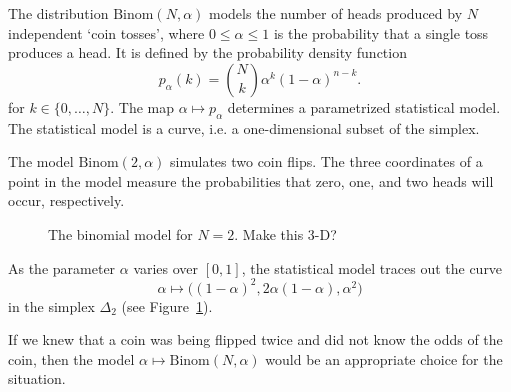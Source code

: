 \documentclass[cclicense]{hmcthesis}
\numberwithin{equation}{chapter}
\numberwithin{thmcounter}{chapter}
\begin{document}
    \begin{example}

        The distribution $\mathrm{Binom}(N, \alpha)$ models the number of heads
        produced by $N$ independent `coin tosses', where \mbox{$0 \le \alpha \le
        1$} is the probability that a single toss produces a head.  It is
        defined by the probability density function
        \[
            p_\alpha(k) = {N \choose k} \alpha^k(1-\alpha)^{n-k}.
        \]
        for $k \in \{0, \ldots, N\}$.  The map $\alpha \mapsto p_\alpha$
        determines a parametrized statistical model.  The statistical model is a
        curve, i.e. a one-dimensional subset of the simplex.  

        The model $\mathrm{Binom}(2, \alpha)$ simulates two coin flips.  The
        three coordinates of a point in the model measure the probabilities that
        zero, one, and two heads will occur, respectively.

        \begin{figure}[H]
            \centering
            \vspace*{-0.2cm}
            \vspace*{-0.5cm}
            \caption{The binomial model for $N=2$. Make this 3-D?}
            \label{fig:binomial}
        \end{figure}

        \noindent As the parameter $\alpha$ varies over $[0,1]$, the statistical
        model traces out the curve 
        \[
            \alpha \longmapsto \big((1-\alpha)^2, 2\alpha(1-\alpha), \alpha^2\big)
        \]
        in the simplex $\Delta_2$ (see Figure~\ref{fig:binomial}).  

        If we knew that a coin was being flipped twice and did not know the
        odds of the coin, then the model $\alpha \mapsto \mathrm{Binom}(N,
        \alpha)$ would be an appropriate choice for the situation.
    \end{example}
\end{document}
